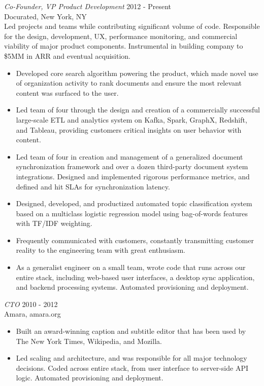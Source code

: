 \documentclass[overlapped, 10pt]{res} %
\begin{document}
\begin{resume}
{\sl Co-Founder, VP Product Development} \hfill 2012 - Present \\
Docurated, New York, NY\vspace{2pt}\\
Led projects and teams while contributing significant volume of code. Responsible for the design, development, UX, performance monitoring, and commercial viability of major product components. Instrumental in building company to \$5MM in ARR and eventual acquisition.
\begin{itemize}
\item Developed core search algorithm powering the product, which made novel use of organization activity to rank documents and ensure the most relevant content was surfaced to the user.
\item Led team of four through the design and creation of a commercially successful large-scale ETL and analytics system on Kafka, Spark, GraphX, Redshift, and Tableau, providing customers critical insights on user behavior with content.
\item Led team of four in creation and management of a generalized document synchronization framework and over a dozen third-party document system integrations. Designed and implemented rigorous performance metrics, and defined and hit SLAs for synchronization latency.
\item Designed, developed, and productized automated topic classification system based on a multiclass logistic regression model using bag-of-words features with TF/IDF weighting.
\item Frequently communicated with customers, constantly transmitting customer reality to the engineering team with great enthusiasm.
\item As a generalist engineer on a small team, wrote code that runs across our entire stack, including web-based user interfaces, a desktop sync application, and backend processing systems. Automated provisioning and deployment.
\end{itemize} 

{\sl CTO} \hfill 2010 - 2012 \\
Amara, amara.org
\begin{itemize}
\item Built an award-winning caption and subtitle editor that has been used by The New York Times, Wikipedia, and Mozilla.
\item Led scaling and architecture, and was responsible for all major technology decisions. Coded across entire stack, from user interface to server-side API logic. Automated provisioning and deployment.
\end{itemize}


\end{resume}
\end{document}
